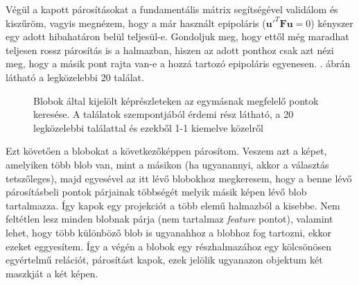 Végül a kapott párosításokat a fundamentális mátrix segítségével validálom és kiszűröm, vagyis megnézem, hogy a már használt epipoláris ($\mathbf{u}'^T \mathbf{F} \mathbf{u} = 0$) kényszer egy adott hibahatáron belül teljesül-e. Gondoljuk meg, hogy ettől még maradhat teljesen rossz párosítás is a halmazban, hiszen az adott ponthoz csak azt nézi meg, hogy a másik pont rajta van-e a hozzá tartozó epipoláris egyenesen. . ábrán látható a legközelebbi 20 találat. 

\begin{figure}[tbh]
\centering


\caption{Blobok által kijelölt képrészleteken az egymásnak megfelelő pontok keresése. A találatok szempontjából érdemi rész látható, a 20 legközelebbi találattal és ezekből 1-1 kiemelve közelről \label{fig:multi-obj-matches}}
\end{figure}

Ezt követően a blobokat a következőképpen párosítom. Veszem azt a képet, amelyiken több blob van, mint a másikon (ha ugyanannyi, akkor a választás tetszőleges), majd egyesével az itt lévő blobokhoz megkeresem, hogy a benne lévő párosításbeli pontok párjainak többségét melyik másik képen lévő blob tartalmazza. Így kapok egy projekciót a több elemű halmazból a kisebbe. Nem feltétlen lesz minden blobnak párja (nem tartalmaz \textit{feature} pontot), valamint lehet, hogy több különböző blob is ugyanahhoz a blobhoz fog tartozni, ekkor ezeket eggyesítem. Így a végén a blobok egy részhalmazához egy kölcsönösen egyértelmű relációt, párosítást kapok, ezek jelölik ugyanazon objektum két maszkját a két képen. %

